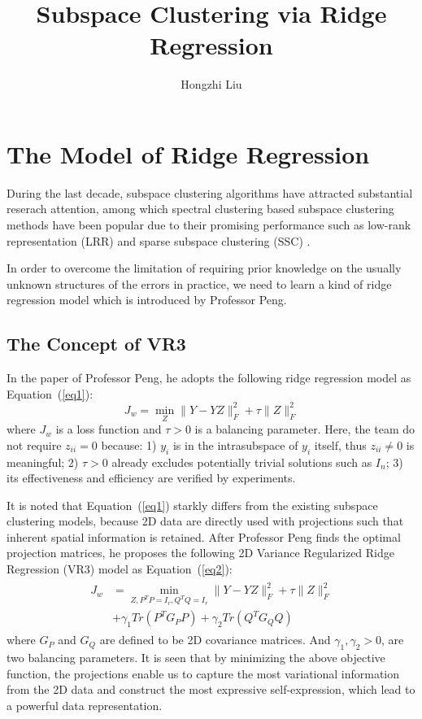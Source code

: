 \documentclass[twocolumn]{article}
\author{Hongzhi Liu}
\title{Subspace Clustering via Ridge Regression}
\begin{document}
	\maketitle
	\par
	\section{The Model of Ridge Regression}
	During the last decade, subspace clustering algorithms have attracted substantial reserach attention, among which spectral clustering based subspace clustering methods have been popular due to their promising performance such as low-rank representation (LRR) \cite{Liu2010Robust} and sparse subspace clustering (SSC) \cite{Elhamifar2013Sparse}. 
	
	In order to overcome the limitation of requiring prior knowledge on the usually unknown structures of the errors in practice, we need to learn a kind of ridge regression model \cite{Peng2017Subspace} which is introduced by Professor Peng.
	\subsection{The Concept of VR3}
	 In the paper of Professor Peng, he adopts the following ridge regression model as Equation~(\ref{eq1}):
	\begin{equation}
	J_w= \min_Z \parallel Y-YZ\parallel_F^2+ \tau\parallel Z\parallel_F^2 \label{eq1}
	\end{equation}
	where $J_w$ is a loss function and $\tau > 0$ is a balancing parameter. Here, the team do not require $z_{ii} = 0$ because: 1) $y_i$ is in the intrasubspace of $y_i$ itself, thus $z_{ii} \neq 0$ is meaningful; 2) $\tau > 0$ already excludes potentially trivial solutions such as $I_n$; 3) its effectiveness and efficiency are verified by experiments.
	
	It is noted that Equation~(\ref{eq1}) starkly differs from the existing subspace clustering models, because 2D data are directly used with projections such that inherent spatial information is retained. After Professor Peng finds the optimal projection matrices, he proposes the following 2D Variance Regularized Ridge Regression (VR3) model as Equation~(\ref{eq2}): 
	\begin{equation}
	\begin{aligned}
	\begin{split}
	J_w&= \min_{Z,P^TP=I_r,Q^TQ=I_r} \parallel Y-YZ \parallel_F^2+ \tau \parallel Z \parallel_F^2 \\
	&+\gamma_1 Tr\left(P^TG_PP\right)+\gamma_2 Tr\left(Q^TG_QQ\right)    \label{eq2}
	\end{split} 
	\end{aligned}
	\end{equation}
	where $G_P$ and $G_Q$ are defined to be 2D covariance matrices. And $\gamma_1, \gamma_2 > 0$, are two balancing parameters. It is seen that by minimizing the above objective function, the projections enable us to capture the most variational information from the 2D data and construct the most expressive self-expression, which lead to a powerful data representation.
\end{document}
